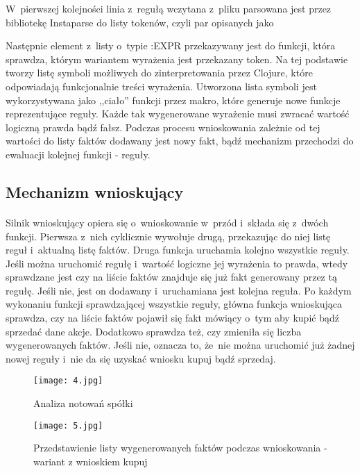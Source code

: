 W~pierwszej kolejności linia z~regułą wczytana z~pliku parsowana jest przez bibliotekę Instaparse\cite{instaparse} do listy tokenów, czyli par opisanych jako
\begin{figure}[h]
\end{figure}

Następnie element z~listy o~typie :EXPR przekazywany jest do funkcji, która sprawdza, którym wariantem wyrażenia jest przekazany token. Na tej podstawie tworzy listę symboli możliwych do zinterpretowania przez Clojure, które odpowiadają funkcjonalnie treści wyrażenia. Utworzona lista symboli jest wykorzystywana jako ,,ciało'' funkcji przez makro, które generuje nowe funkcje reprezentujące reguły. Każde tak wygenerowane wyrażenie musi zwracać wartość logiczną prawda bądź fałsz. Podczas procesu wnioskowania zależnie od tej wartości do listy faktów dodawany jest nowy fakt, bądź mechanizm przechodzi do ewaluacji kolejnej funkcji - reguły.

\subsection{Mechanizm wnioskujący}

\paragraph{}
Silnik wnioskujący opiera się o~wnioskowanie w~przód i~składa się z~dwóch funkcji. Pierwsza z~nich cyklicznie wywołuje drugą, przekazując do niej listę reguł i~aktualną listę faktów. Druga funkcja uruchamia kolejno wszystkie reguły. Jeśli można uruchomić regułę i~wartość logiczne jej wyrażenia to prawda, wtedy sprawdzane jest czy na liście faktów znajduje się już fakt generowany przez tą regułę. Jeśli nie, jest on dodawany i~uruchamiana jest kolejna reguła. Po każdym wykonaniu funkcji sprawdzającej wszystkie reguły, główna funkcja wnioskująca sprawdza, czy na liście faktów pojawił się fakt mówiący o~tym aby kupić bądź sprzedać dane akcje. Dodatkowo sprawdza też, czy zmieniła się liczba wygenerowanych faktów. Jeśli nie, oznacza to, że~nie można uruchomić już żadnej nowej reguły i~nie da się uzyskać wniosku kupuj bądź sprzedaj.

\begin{figure}[H]
	\centering
	\texttt{[image: 4.jpg]}
	\caption{Analiza notowań spółki}
	\label{fig:4}
\end{figure}

\begin{figure}[H]
	\centering
	\texttt{[image: 5.jpg]}
	\caption{Przedstawienie listy wygenerowanych faktów podczas wnioskowania - wariant z wnioskiem kupuj}
	\label{fig:5}
\end{figure}

